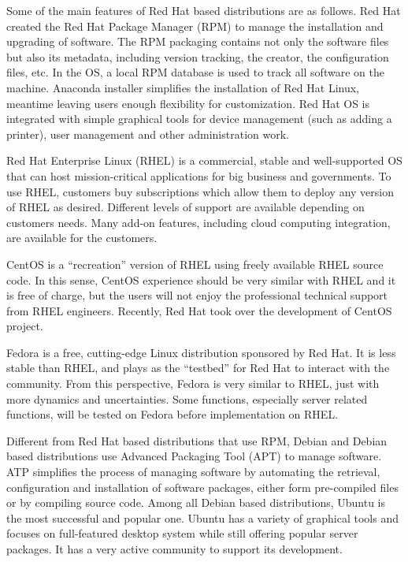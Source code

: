 Some of the main features of Red Hat based distributions are as follows. Red Hat created the Red Hat Package Manager (RPM) to manage the installation and upgrading of software. The RPM packaging contains not only the software files but also its metadata, including version tracking, the creator, the configuration files, etc. In the OS, a local RPM database is used to track all software on the machine. Anaconda installer simplifies the installation of Red Hat Linux, meantime leaving users enough flexibility for customization. Red Hat OS is integrated with simple graphical tools for device management (such as adding a printer), user management and other administration work.

Red Hat Enterprise Linux (RHEL) is a commercial, stable and well-supported OS that can host mission-critical applications for big business and governments. To use RHEL, customers buy subscriptions which allow them to deploy any version of RHEL as desired. Different levels of support are available depending on customers needs. Many add-on features, including cloud computing integration, are available for the customers.

CentOS is a ``recreation'' version of RHEL using freely available RHEL source code. In this sense, CentOS experience should be very similar with RHEL and it is free of charge, but the users will not enjoy the professional technical support from RHEL engineers.
Recently, Red Hat took over the development of CentOS project.

Fedora is a free, cutting-edge Linux distribution sponsored by Red Hat. It is less stable than RHEL, and plays as the ``testbed'' for Red Hat to interact with the community. From this perspective, Fedora is very similar to RHEL, just with more dynamics and uncertainties. Some functions, especially server related functions, will be tested on Fedora before implementation on RHEL.

Different from Red Hat based distributions that use RPM, Debian and Debian based distributions use Advanced Packaging Tool (APT) to manage software. ATP simplifies the process of managing software by automating the retrieval, configuration and installation of  software packages, either form pre-compiled files or by compiling source code. Among all Debian based distributions, Ubuntu is the most successful and popular one. Ubuntu has a variety of graphical tools and focuses on full-featured desktop system while still offering popular server packages. It has a very active community to support its development.

